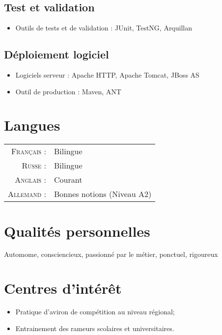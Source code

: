 \documentclass[letter,10pt]{article} %
\begin{document}
\subsection*{Test et validation} 
\begin{itemize}
\item Outils de tests et de validation : JUnit, TestNG, Arquillan
\end{itemize}

\subsection*{D\'{e}ploiement logiciel}
\begin{itemize} 
\item Logiciels serveur : Apache HTTP, Apache Tomcat, JBoss AS
\item Outil de production : Maven, ANT
\end{itemize} 
  

\section{Langues}

\begin{tabular}{rl}
\textsc{Fran\c cais :} & Bilingue\\
\textsc{Russe :} & Bilingue\\
\textsc{Anglais :} & Courant\\
\textsc{Allemand :} & Bonnes notions (Niveau A2)\\
\end{tabular}


\section{Qualit\'{e}s personnelles}

Automome, consciencieux, passionn\'{e} par le m\'{e}tier, ponctuel,  rigoureux

\section{Centres d'int\'{e}r\^{e}t}

\begin{itemize}
\item Pratique d'aviron de comp\'{e}tition au niveau r\'{e}gional; 
\item Entrainement des rameurs scolaires et universitaires.
\end{itemize}

\end{document}
